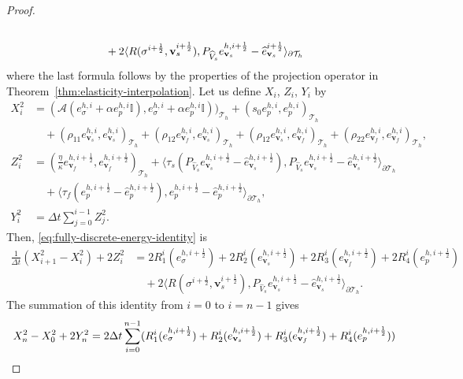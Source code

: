 \documentclass[10pt,letterpaper]{amsart}
\theoremstyle{plain} %
\theoremstyle{remark} %
\newcommand{\vect}[1]{\mathbf{#1}}
\newcommand{\Id}{\mathbb{I}} %
\newcommand{\Ael}{\mathcal{A}} %
\newcommand{\Thprod}[2]{( #1, #2 )_{\mathcal{T}_h}}
\newcommand{\pThprod}[2]{\langle #1, #2 \rangle_{\partial \mathcal{T}_{h}}}
\begin{document}
\begin{proof}
\begin{align}
	\\
	\notag
	&\quad + 2 \pThprod{R(\sigma^{i+\frac 12}, \vect{v}_s^{i+\frac 12})}{{P_{\widehat{V}_s}} e_{\vect{v}_s}^{h,i+\frac 12} - \widehat{e}_{\vect{v}_s}^{i+\frac 12}}
\end{align}
%
where the last formula follows by the properties of the projection operator in Theorem~\ref{thm:elasticity-interpolation}. 
Let us define $X_i$, $Z_i$, $Y_i$ by 
%
\begin{align*}
	X_i^2 &= \Thprod{\Ael(e_{\sigma}^{h,i} + \alpha e_{p}^{h,i} \Id)}{e_{\sigma}^{h,i} + \alpha e_{p}^{h,i} \Id)} +\Thprod{s_{0}e_{p}^{h,i}}{e_{p}^{h,i}}
	\\
	&\quad + \Thprod{\rho_{11} e_{\vect{v}_{s}}^{h,i}}{e_{\vect{v}_{s}}^{h,i}} + \Thprod{\rho_{12} e_{\vect{v}_{f}}^{h,i}}{e_{\vect{v}_{s}}^{h,i}} + \Thprod{\rho_{12} e_{\vect{v}_{s}}^{h,i}}{e_{\vect{v}_{f}}^{h,i}} + \Thprod{\rho_{22} e_{\vect{v}_{f}}^{h,i}}{e_{\vect{v}_{f}}^{h,i}} ,
	\\
	Z_i^2 &=  \Thprod{\frac{\eta}{\kappa} e_{\vect{v}_{f}}^{h,i+\frac 12}}{e_{\vect{v}_{f}}^{h,i+\frac 12}} + \pThprod{\tau_{s} ({P_{\widehat{V}_s}} e_{\vect{v}_{s}}^{h, i+\frac 12} - \widehat{e}_{\vect{v}_{s}}^{h,i+\frac 12})}{{P_{\widehat{V}_s}} e_{\vect{v}_{s}}^{h,i+\frac 12} - \widehat{e}_{\vect{v}_{s}}^{h,i+\frac 12}} 
	\\
	&\quad + \pThprod{\tau_{f} (e_{p}^{h,i+\frac 12} - \widehat{e}_{p}^{h,i+\frac 12})}{e_{p}^{h,i+\frac 12} - \widehat{e}_{p}^{h,i+\frac 12}},
	\\
	Y_i^2 &= \Delta t \sum_{j=0}^{i-1}Z_j^2 .
\end{align*}
%
Then, \eqref{eq:fully-discrete-energy-identity} is 
%
\begin{align*}
	\frac{1}{\Delta t} (X_{i+1}^2 - X_i^2) + 2 Z_i^2 &= 2 R_1^i(e_{\sigma}^{h,i+\frac 12}) + 2 R_2^i(e_{\vect{v}_s}^{h,i+\frac 12}) + 2 R_3^i(e_{\vect{v}_f}^{h,i+\frac 12}) + 2 R_4^i(e_{p}^{h,i+\frac 12}) 
	\\
	&\quad + 2\pThprod{R(\sigma^{i+\frac 12}, \vect{v}_s^{i+\frac 12})}{{P_{\widehat{V}_s}} e_{\vect{v}_{s}}^{h,i+\frac 12} - \widehat{e}_{\vect{v}_{s}}^{h,i+\frac 12}}.
\end{align*}
%
The summation of this identity from $i=0$ to $i=n-1$ gives
%
\begin{align}
	\notag
	X_n^2 - X_0^2 + 2 Y_n^2 &= 2 \Delta t \sum_{i=0}^{n-1} (R_1^i(e_{\sigma}^{h,i+\frac 12}) + R_2^i(e_{\vect{v}_s}^{h,i+\frac 12}) + R_3^i(e_{\vect{v}_f}^{h,i+\frac 12}) + R_4^i(e_{p}^{h,i+\frac 12}))
	\\

\end{align}
\end{proof}
\end{document}

